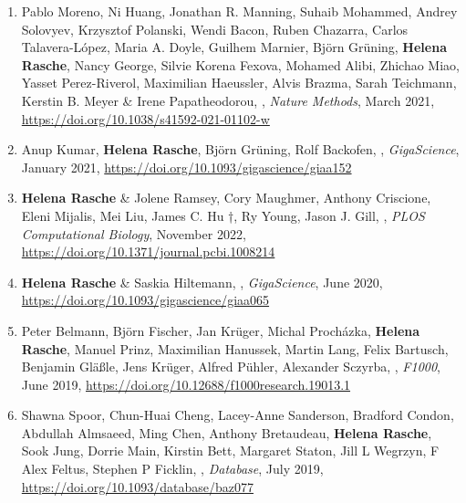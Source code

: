 \begin{enumerate}
\item Pablo Moreno, Ni Huang, Jonathan R. Manning, Suhaib Mohammed, Andrey Solovyev, Krzysztof Polanski, Wendi Bacon, Ruben Chazarra, Carlos Talavera-López, Maria A. Doyle, Guilhem Marnier, Björn Grüning, \textbf{Helena Rasche}, Nancy George, Silvie Korena Fexova, Mohamed Alibi, Zhichao Miao, Yasset Perez-Riverol, Maximilian Haeussler, Alvis Brazma, Sarah Teichmann, Kerstin B. Meyer \& Irene Papatheodorou, {\color{chaptergrey}{User-friendly, scalable tools and workflows for single-cell RNA-seq analysis}}, \textit{Nature Methods}, March 2021, \url{https://doi.org/10.1038/s41592-021-01102-w}

\item Anup Kumar, \textbf{Helena Rasche}, Björn Grüning, Rolf Backofen, {\color{chaptergrey}{Tool recommender system in Galaxy using deep learning}}, \textit{GigaScience}, January 2021, \url{https://doi.org/10.1093/gigascience/giaa152}

\item \textbf{Helena Rasche} \& Jolene Ramsey, Cory Maughmer, Anthony Criscione, Eleni Mijalis, Mei Liu, James C. Hu †, Ry Young, Jason J. Gill, {\color{chaptergrey}{Galaxy and Apollo as a biologist-friendly interface for high-quality cooperative phage genome annotation}}, \textit{PLOS Computational Biology}, November 2022, \url{https://doi.org/10.1371/journal.pcbi.1008214}\label{phages}

\item \textbf{Helena Rasche} \& Saskia Hiltemann, {\color{chaptergrey}{Galactic Circos: User-friendly Circos plots within the Galaxy platform}}, \textit{GigaScience}, June 2020, \url{https://doi.org/10.1093/gigascience/giaa065}\label{circos}

\item Peter Belmann, Björn Fischer, Jan Krüger, Michal Procházka, \textbf{Helena Rasche}, Manuel Prinz, Maximilian Hanussek, Martin Lang, Felix Bartusch, Benjamin Gläßle, Jens Krüger, Alfred Pühler, Alexander Sczyrba, {\color{chaptergrey}{de.NBI Cloud federation through ELIXIR AAI}}, \textit{F1000}, June 2019, \url{https://doi.org/10.12688/f1000research.19013.1}

\item Shawna Spoor, Chun-Huai Cheng, Lacey-Anne Sanderson, Bradford Condon, Abdullah Almsaeed, Ming Chen, Anthony Bretaudeau, \textbf{Helena Rasche}, Sook Jung, Dorrie Main, Kirstin Bett, Margaret Staton, Jill L Wegrzyn, F Alex Feltus, Stephen P Ficklin, {\color{chaptergrey}{Tripal v3: an ontology-based toolkit for construction of FAIR biological community databases}}, \textit{Database}, July 2019, \url{https://doi.org/10.1093/database/baz077}


\end{enumerate}
